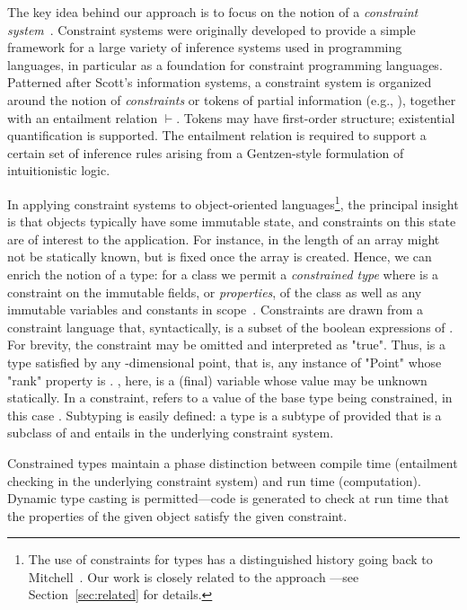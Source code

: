The key idea behind our approach is to focus on the notion of a
\emph{constraint system}~\cite{cccc}. Constraint systems were originally developed
to provide a simple framework for a large variety of
inference systems used in programming languages, in particular as a
foundation for constraint programming languages.  Patterned after
Scott's information systems, a constraint system is
organized around the notion of \emph{constraints} or tokens of partial
information (e.g., ), together with an entailment
relation $\vdash$.  Tokens may have first-order structure; existential
quantification is supported. The entailment relation is required to
support a certain set of inference rules arising from a Gentzen-style
formulation of intuitionistic logic.

In applying constraint systems to object-oriented
languages\footnote{The use of constraints for types has a
distinguished history going back to Mitchell~\cite{mitchell84}.
Our work is closely related to the \hmx{} approach
\cite{sulzmann97type}---see Section~\ref{sec:related} for
details.}, the principal insight
is that objects typically have some immutable state, and constraints on
this state are of interest to the application.  For instance, in \Java{}
the length of an array might not be statically known, but is fixed once
the array is created. Hence, we can enrich the notion of a type: for a
class  we permit a \emph{constrained type}  where 
is a
constraint on the immutable fields, or \emph{properties}, of the
class as well as any immutable variables and constants in
scope~\cite{constrained-types}.
Constraints are drawn from a constraint language that,
syntactically, is a subset of the boolean expressions of \Xten{}.  For
brevity, the constraint may be omitted and interpreted as \xcd"true".
Thus, 
 is a type satisfied by any
-dimensional point, that is, any
instance of \xcd"Point" whose \xcd"rank" property
is .  , here, is a (final) variable whose value may be unknown
statically. In a constraint,  refers to 
a value of the base type being constrained, in this case .
Subtyping is easily defined: a type  is a
subtype of  
provided that  is a subclass of  and 
entails  in the underlying constraint system.

Constrained types maintain a phase distinction between compile time
(entailment checking in the underlying constraint system) and run time
(computation).  Dynamic type casting is permitted---code is generated
to check at run time that the properties of the given object satisfy
the given constraint.


